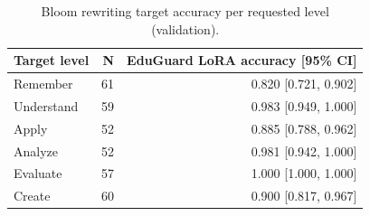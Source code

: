 \begin{table}[t]
\centering
\caption{Bloom rewriting target accuracy per requested level (validation).}
\label{tab:t4_bloom_per_level}
\begin{tabular}{lrr}
\toprule
Target level & N & EduGuard LoRA accuracy [95\% CI] \\
\midrule
Remember & 61 & 0.820 [0.721, 0.902] \\
Understand & 59 & 0.983 [0.949, 1.000] \\
Apply & 52 & 0.885 [0.788, 0.962] \\
Analyze & 52 & 0.981 [0.942, 1.000] \\
Evaluate & 57 & 1.000 [1.000, 1.000] \\
Create & 60 & 0.900 [0.817, 0.967] \\
\bottomrule
\end{tabular}
\end{table}
